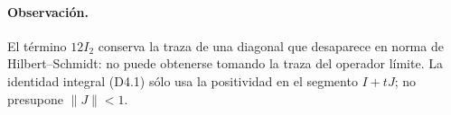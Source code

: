 \paragraph{Observación.}
El término $12I_2$ conserva la traza de una diagonal que desaparece
en norma de Hilbert--Schmidt: no puede obtenerse tomando la traza del operador límite.
La identidad integral (D4.1) sólo usa la positividad en el segmento $I+tJ$;
no presupone $\|J\|<1$.
